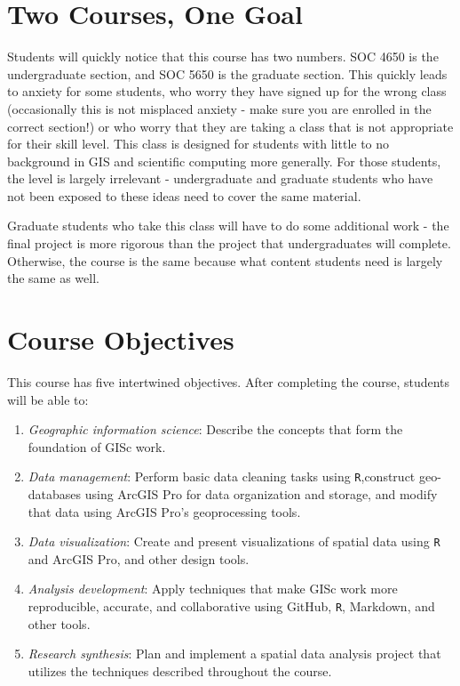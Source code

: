 \documentclass[]{book}
\begin{document}
\hypertarget{two-courses-one-goal}{%
\section{Two Courses, One Goal}\label{two-courses-one-goal}}

Students will quickly notice that this course has two numbers. SOC 4650 is the undergraduate section, and SOC 5650 is the graduate section. This quickly leads to anxiety for some students, who worry they have signed up for the wrong class (occasionally this is not misplaced anxiety - make sure you are enrolled in the correct section!) or who worry that they are taking a class that is not appropriate for their skill level. This class is designed for students with little to no background in GIS and scientific computing more generally. For those students, the level is largely irrelevant - undergraduate and graduate students who have not been exposed to these ideas need to cover the same material.

Graduate students who take this class will have to do some additional work - the final project is more rigorous than the project that undergraduates will complete. Otherwise, the course is the same because what content students need is largely the same as well.

\hypertarget{course-objectives}{%
\section{Course Objectives}\label{course-objectives}}

This course has five intertwined objectives. After completing the course, students will be able to:

\begin{enumerate}
\def\labelenumi{\arabic{enumi}.}
\item
  \emph{Geographic information science}: Describe the concepts that form the foundation of GISc work.
\item
  \emph{Data management}: Perform basic data cleaning tasks using \texttt{R},construct geo-databases using ArcGIS Pro for data organization and storage, and modify that data using ArcGIS Pro's geoprocessing tools.
\item
  \emph{Data visualization}: Create and present visualizations of spatial data using \texttt{R} and ArcGIS Pro, and other design tools.
\item
  \emph{Analysis development}: Apply techniques that make GISc work more reproducible, accurate, and collaborative using GitHub, \texttt{R}, Markdown, and other tools.
\item
  \emph{Research synthesis}: Plan and implement a spatial data analysis project that utilizes the techniques described throughout the course.
\end{enumerate}
\end{document}
